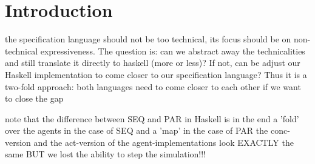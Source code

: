 \section{Introduction}
 the specification language should not be too technical, its focus should be on non-technical expressiveness. The question is: can we abstract away the technicalities and still translate it directly to haskell (more or less)? If not, can be adjust our Haskell implementation to come closer to our specification language? Thus it is a two-fold approach: both languages need to come closer to each other if we want to close the gap
 
 note that the difference between SEQ and PAR in Haskell is in the end a 'fold' over the agents in the case of SEQ and a 'map' in the case of PAR
 the conc-version and the act-version of the agent-implementations look EXACTLY the same	 BUT we lost the ability to step the simulation!!!
